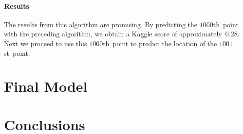 \documentclass[twoside]{article}
\begin{document}
\paragraph{Results}

The results from this algorithm are promising.
By predicting the $\num{1000}$th~point with the preceding algorithm, we obtain a Kaggle score of approximately~$0.28$.
Next we proceed to use this $\num{1000}$th~point to predict the location of the $\num{1001}$st~point.

\section{Final Model}\label{sec:final-model}

\section{Conclusions}\label{sec:conclusions}
\end{document}
